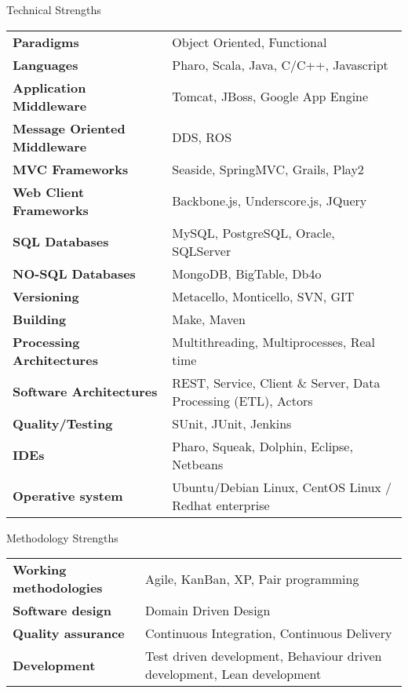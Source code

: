 \documentclass{resume} %
\begin{document}
\begin{rSection}{Technical Strengths}
	\begin{tabular}{ @{} >{\bfseries}l @{\hspace{6ex}} l }
		Paradigms & Object Oriented, Functional \\
		Languages & Pharo, Scala, Java, C/C++, Javascript  \\
		Application Middleware & Tomcat, JBoss, Google App Engine \\
		Message Oriented Middleware & DDS, ROS \\
		MVC Frameworks &  Seaside, SpringMVC, Grails, Play2 \\
		Web Client Frameworks & Backbone.js, Underscore.js, JQuery \\
		SQL Databases & MySQL, PostgreSQL, Oracle, SQLServer  \\
		NO-SQL Databases & MongoDB, BigTable, Db4o  \\
		Versioning & Metacello, Monticello, SVN, GIT \\
		Building & Make, Maven \\
		Processing Architectures & Multithreading, Multiprocesses, Real time \\
		Software Architectures & REST, Service,  Client \& Server, Data Processing (ETL), Actors\\
		Quality/Testing & SUnit, JUnit, Jenkins \\
		IDEs & Pharo, Squeak, Dolphin, Eclipse, Netbeans \\
		Operative system & Ubuntu/Debian Linux, CentOS Linux / Redhat enterprise \\
	\end{tabular}
\end{rSection}

\begin{rSection}{Methodology Strengths}

\begin{tabular}{ @{} >{\bfseries}l @{\hspace{6ex}} l }
	Working methodologies & Agile, KanBan, XP, Pair programming  \\
	Software design & Domain Driven Design  \\
	Quality assurance & Continuous Integration, Continuous Delivery \\
	Development & Test driven development, Behaviour driven development, Lean development \\
\end{tabular}

\end{rSection}
\end{document}

